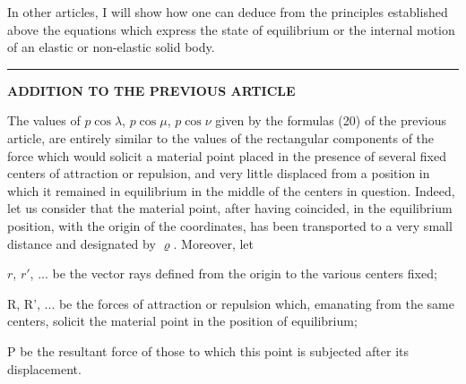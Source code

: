 \documentclass[leqno,openright,smallroyalvopaper,8pt,twoside,showtrims]{memoir}
\begin{document}
\vspace*{.5cm}
In other articles, I will show how one can deduce from the principles established above the equations which express the state of equilibrium or the internal motion of an elastic or non-elastic solid body.

\vspace*{.5cm}
\noindent 
\begin{center}
 \quad{}\quad{}\vspace*{.5cm}
 \end{center}

\noindent\rule{\textwidth}{0.5pt}\vspace*{-\baselineskip}\vspace*{2pt} 

\setcounter{equation}{0}
\vspace*{1cm}
\begin{center}
{\LARGE \textbf{ADDITION TO THE PREVIOUS ARTICLE}}\vspace*{3pt} 
\end{center}

The values of $p\cos\lambda$, $p\cos\mu$, $p\cos\nu$ given by the formulas (20) of the previous article, are entirely similar to the values of the rectangular components of the force which would solicit a material point placed in the presence of several fixed centers of attraction or repulsion, and very little displaced from a position in which it remained in equilibrium in the middle of the centers in question. Indeed, let us consider that the material point, after having coincided, in the equilibrium position, with the origin of the coordinates, has been transported to a very small distance and designated by $\varrho$. Moreover, let

\noindent $r$, $r'$, ... be the vector rays defined from the origin to the various centers fixed;

\noindent R, R', ... be the forces of attraction or repulsion which, emanating from the same centers, solicit the material point in the position of equilibrium;

\noindent P be the resultant force of those to which this point is subjected after its displacement.
\end{document}
